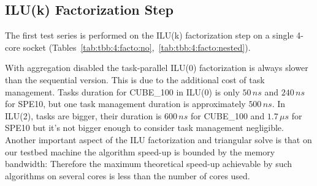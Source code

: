 

\subsection{ILU(k) Factorization Step}
\label{precond_step}
The first test series is performed on the ILU(k) factorization step
on a single 4-core socket (Tables~\ref{tab:tbb:4:facto:no},~\ref{tab:tbb:4:facto:nested}).

With aggregation disabled the task-parallel ILU(0) factorization is always
slower than the sequential version. This is due to the additional cost
of task management. Tasks duration for CUBE\_100 in ILU(0) is only $50\,ns$ and 
$240\,ns$ for SPE10, but one task
management duration is approximately $500\,ns$. In ILU(2), tasks are bigger, their
duration is $600\,ns$ for CUBE\_100 and $1.7\,\mu{s}$ for SPE10 but it's
not bigger enough to consider task management negligible.
Another important aspect of the ILU factorization and triangular solve is that on our testbed machine 
the algorithm speed-up is bounded by the memory bandwidth: Therefore the maximum theoretical speed-up achievable 
by such algorithms on several cores is less than the number of cores used. 

